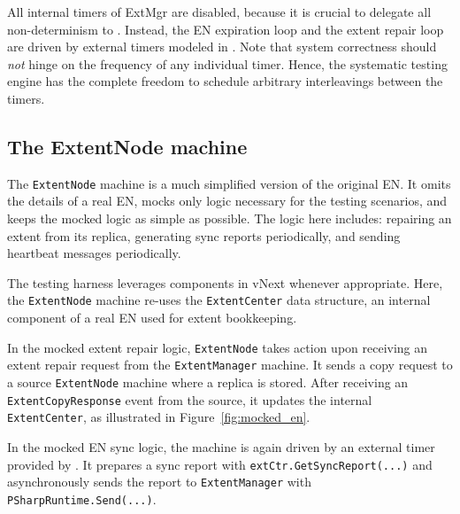 All internal timers of ExtMgr are disabled, because it is crucial to delegate all non-determinism to \psharp. Instead, the EN expiration loop and the extent repair loop are driven by external timers modeled in \psharp. Note that system correctness should {\em not} hinge on the frequency of any individual timer. Hence, the \psharp systematic testing engine has the complete freedom to schedule arbitrary interleavings between the timers.

\subsection{The ExtentNode machine}
\label{sec:method:mock_en}

The \texttt{ExtentNode} machine is a much simplified version of the original EN. It omits the details of a real EN, mocks only logic necessary for the testing scenarios, and keeps the mocked logic as simple as possible. The logic here includes: repairing an extent from its replica, generating sync reports periodically, and sending heartbeat messages periodically.

The testing harness leverages components in vNext whenever appropriate. Here, the \texttt{ExtentNode} machine re-uses the \texttt{ExtentCenter} data structure, an internal component of a real EN used for extent bookkeeping.

In the mocked extent repair logic, \texttt{ExtentNode} takes action upon receiving an extent repair request from the \texttt{ExtentManager} machine. It sends a copy request to a source \texttt{ExtentNode} machine where a replica is stored. After receiving an \texttt{ExtentCopyResponse} event from the source, it updates the internal \texttt{ExtentCenter}, as illustrated in Figure~\ref{fig:mocked_en}. 

In the mocked EN sync logic, the machine is again driven by an external timer provided by \psharp. It prepares a sync report with \texttt{extCtr.GetSyncReport(...)} and asynchronously sends the report to \texttt{ExtentManager} with \texttt{PSharpRuntime.Send(...)}.

